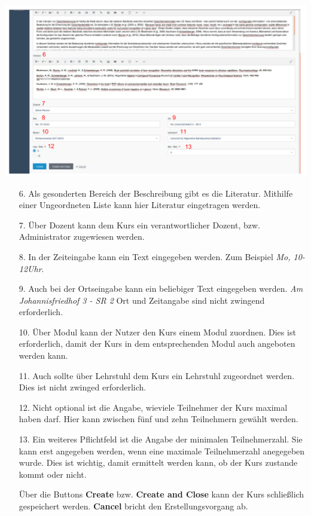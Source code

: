     \includegraphics[scale=0.3]{backend/img/create_course_2.pdf}
    \begin{enumerate}
     \item[6.] Als gesonderten Bereich der Beschreibung gibt es die Literatur. Mithilfe einer Ungeordneten Liste kann hier Literatur eingetragen werden.
     \item[7.] Über Dozent kann dem Kurs ein verantwortlicher Dozent, bzw. Administrator zugewiesen werden.
     \item[8.] In der Zeiteingabe kann ein Text eingegeben werden. Zum Beispiel \textit{Mo, 10-12Uhr}. 
     \item[9.] Auch bei der Ortseingabe kann ein beliebiger Text eingegeben werden. \textit{Am Johannisfriedhof 3 - SR 2}
	       Ort und Zeitangabe sind nicht zwingend erforderlich.
     \item[10.]Über Modul kann der Nutzer den Kurs einem Modul zuordnen. Dies ist erforderlich, damit der Kurs in dem entsprechenden Modul auch angeboten werden kann.
     \item[11.]Auch sollte über Lehrstuhl dem Kurs ein Lehrstuhl zugeordnet werden. Dies ist nicht zwinged erforderlich.
     \item[12.]Nicht optional ist die Angabe, wieviele Teilnehmer der Kurs maximal haben darf. Hier kann zwischen fünf und zehn Teilnehmern gewählt werden.
     \item[13.]Ein weiteres Pflichtfeld ist die Angabe der minimalen Teilnehmerzahl. Sie kann erst angegeben werden, wenn eine maximale Teilnehmerzahl anegegeben wurde.
	       Dies ist wichtig, damit ermittelt werden kann, ob der Kurs zustande kommt oder nicht.
     \item[]Über die Buttons \textbf{Create} bzw. \textbf{Create and Close} kann der Kurs schließlich gespeichert werden. \textbf{Cancel} bricht den Erstellungsvorgang ab.
    \end{enumerate}

